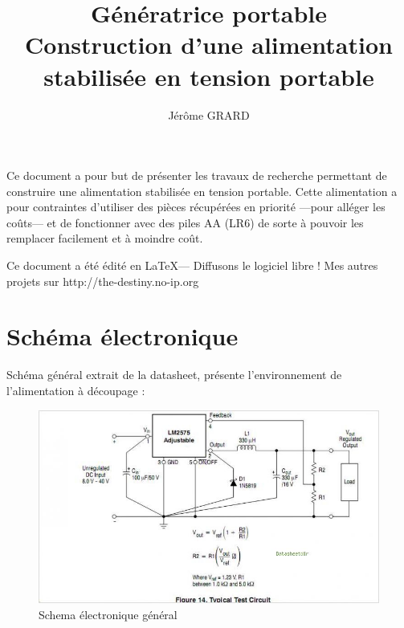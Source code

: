 \documentclass[12pt]{article}
\title{Génératrice portable \\ Construction d'une alimentation \\ stabilisée en tension portable}
\author{Jérôme GRARD}
\newenvironment{remarque}{%
\begin{lrbox}{\boiteremarque}%
\begin{minipage}{.8\textwidth}}{%
\end{minipage}
\end{lrbox}%
\begin{center}
\fbox{\usebox{\boiteremarque}}
\end{center}}
\begin{document}
\maketitle
\thispagestyle{empty}

\begin{remarque}
	Ce document a pour but de présenter les travaux de recherche permettant de construire une
	alimentation stabilisée en tension portable. Cette alimentation a pour contraintes d'utiliser
	des pièces récupérées en priorité ---pour alléger les coûts--- et de fonctionner avec des
	piles AA (LR6) de sorte à pouvoir les remplacer facilement et à moindre coût.\newline
	\begin{center}
		Ce document a été édité en \LaTeX --- Diffusons le logiciel libre ! \newline
		Mes autres projets sur http://the-destiny.no-ip.org
	\end{center}
\end{remarque}

\newpage



\pagestyle{plain}
\setcounter{page}{1}
\tableofcontents


\newpage



\section{Schéma électronique}

Schéma général extrait de la datasheet, présente l'environnement de l'alimentation à découpage :\newline

\begin{figure}[!h]
        \centering
        \includegraphics[scale=0.5]{Schema}
        \caption{Schema électronique général}\label{Schema}
\end{figure}
\end{document}
